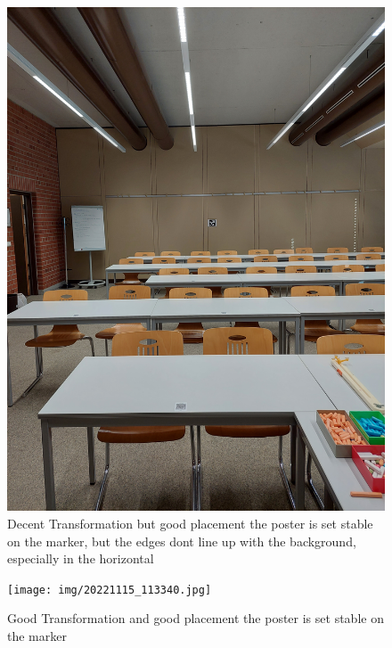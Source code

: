 \documentclass[a4paper,twocolumn]{article}
\begin{document}
    
    \begin{figure}[htbp]
    \centering
    \includegraphics[width=0.9\columnwidth]{img/20221115_113328.jpg} %
    \caption{Decent Transformation but good placement the poster is set stable on the marker, but the edges dont line up with the background, especially in the horizontal}
    \label{fig:20221115_113328.jpg}
    \end{figure}
    
    \begin{figure}[htbp]
    \centering
    \texttt{[image: img/20221115\_113340.jpg]} %
    \caption{Good Transformation and good placement the poster is set stable on the marker}
    \label{fig:20221115_113340.jpg}
    \end{figure}
    
\end{document}
